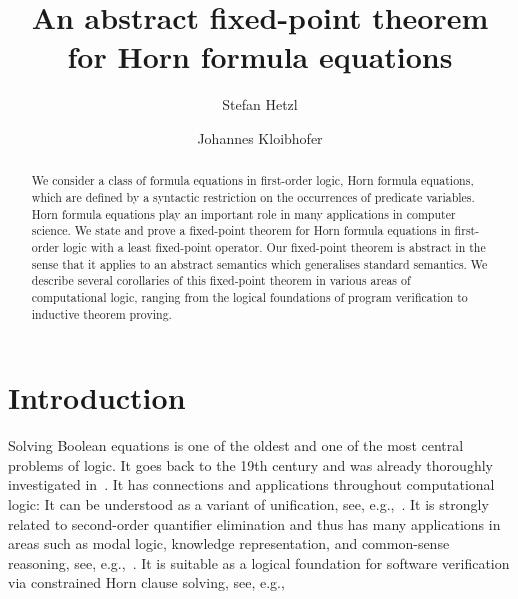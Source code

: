 \documentclass[acmsmall]{acmart}
\theoremstyle{plain}
\theoremstyle{definition}
\begin{document}
\title{An abstract fixed-point theorem for Horn formula equations}

\author{Stefan Hetzl}

\author{Johannes Kloibhofer}

\renewcommand{\shortauthors}{S.~Hetzl \& J.~Kloibhofer}

\begin{abstract}
We consider a class of formula equations in first-order logic, Horn formula equations,
 which are defined by a syntactic restriction on the occurrences of predicate variables.
Horn formula equations play an important role in many applications in computer science.
We state and prove a fixed-point theorem for Horn formula equations in first-order logic with a
 least fixed-point operator.
Our fixed-point theorem is abstract in the sense that it applies to an abstract semantics which generalises
 standard semantics.
We describe several corollaries of this fixed-point theorem in various areas of computational logic,
 ranging from the logical foundations of program verification to inductive theorem proving.
\end{abstract}



\maketitle

\section{Introduction}

Solving Boolean equations is one of the oldest and one of the most central
 problems of logic.
It goes back to the 19th century and was already thoroughly investigated
 in~\cite{Schroeder90Vorlesungen}.
It has connections and applications throughout computational logic:
It can be understood as a variant of unification, see, e.g.,~\cite{Martin89Boolean}.
It is strongly related to second-order quantifier elimination and thus has
 many applications in areas such as modal logic, knowledge representation, and common-sense
 reasoning, see, e.g.,~\cite{Gabbay08Second}.
It is suitable as a logical foundation for software verification via constrained Horn
 clause solving, see, e.g.,~\cite{Bjorner15Horn}
\end{document}
